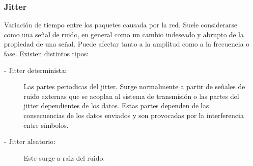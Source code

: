 \documentclass[a4paper, 11pt]{article} %
\begin{document}
		\subsubsection{Jitter} \label{jitter}
			Variación de tiempo entre los paquetes causada por la red. Suele considerarse como una señal de ruido, en general como un cambio indeseado y abrupto de la propiedad de una señal. Puede afectar tanto a la amplitud como a la frecuencia o fase.
			Existen distintos tipos:
			\begin{description}
				\item[- Jitter determinista:] Las partes periodicas del jitter. Surge normalmente a partir de señales de ruido externas que se acoplan al sistema de transmisión o las partes del jitter dependientes de los datos. Estas partes dependen de las consecuencias de los datos enviados y son provocadas por la interferencia entre símbolos.
				\item[- Jitter aleatorio:] Este surge a raiz del ruido.
			\end{description}
\end{document}

